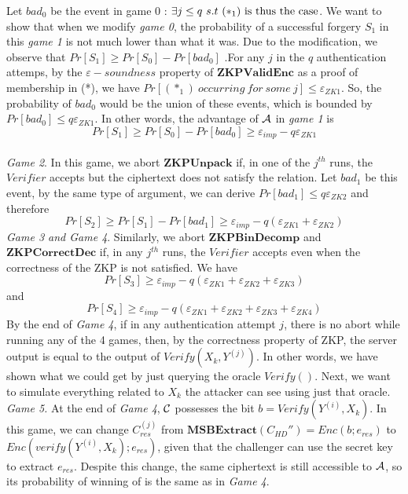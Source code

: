 Let $bad_0$ be the event in game 0 : $\exists j \leq q\  s.t\  (*_1)\
\textnormal{is thus the case}$. We want to show that when we modify \textit{game 0}, the
probability of a successful forgery $S_1$ in this \textit{game 1} is not much
lower than what it was. Due to the modification, we observe that
$
Pr[S_1] \geq Pr[S_0] - Pr[bad_0]
$
.For any $j$ in the $q$ authentication attemps, by the $\varepsilon-soundness$ property of
$\mathbf{ZKPValidEnc}$ as a proof of membership in (*), we have $Pr[(*_1)\
occurring\ for\ some \ j] \leq \varepsilon_{ZK1}$. So, the probability of $bad_0$
would be the union of these events, which is bounded by $Pr[bad_0] \leq
q\varepsilon_{ZK1}$. In other words, the advantage of $\mathcal{A}$ in \textit{game
	1} is
\[
Pr[S_1] \geq Pr[S_0] - Pr[bad_0] \geq \varepsilon_{imp} - q\varepsilon_{ZK1}
\]
\\
\textit{Game 2}. In this game, we abort $\mathbf{ZKPUnpack}$ if, in one of the
$j^{th}$ runs, the $Verifier$ accepts but the ciphertext does not satisfy the
relation. Let $bad_1$ be this event, by the same type of argument, we can
derive $Pr[bad_1] \leq q\varepsilon_{ZK2}$ and therefore
$$Pr[S_2] \geq Pr[S_1]
- Pr[bad_1] \geq \varepsilon_{imp} - q(\varepsilon_{ZK1}+\varepsilon_{ZK2})
$$
\textit{Game 3 and Game 4}. Similarly, we abort $\mathbf{ZKPBinDecomp}$ and
$\mathbf{ZKPCorrectDec}$ if, in any $j^{th}$ runs, the $Verifier$ accepts even
when the correctness of the ZKP is not satisfied. We have
$$Pr[S_3] \geq  \varepsilon_{imp} - q(\varepsilon_{ZK1}+\varepsilon_{ZK2}
+\varepsilon_{ZK3})
$$ and
$$Pr[S_4] \geq  \varepsilon_{imp} - q(\varepsilon_{ZK1}+\varepsilon_{ZK2} +
\varepsilon_{ZK3} + \varepsilon_{ZK4})
$$
By the end of \textit{Game 4}, if in any authentication attempt $j$, there is
no abort while running any of the 4 games, then, by the correctness property of ZKP, the
server output is equal to the output of $Verify(X_k, Y^{(j)})$. In other words,
we have shown what we could get by just querying the oracle $Verify()$. Next,
we want to simulate everything related to $X_k$ the attacker can see using
just that oracle.\\
\textit{Game 5.} At the end of \textit{Game 4}, $\mathcal{C}$ possesses the bit
$b = Verify(Y^{(i)},X_k)$. In this game, we can change $C_{res}^{(j)}$ from
$\mathbf{MSBExtract}(C_{HD}'') = Enc(b;e_{res})$ to
$Enc(verify(Y^{(i)},X_k);e_{res})$, given that the challenger can use the
secret key to extract $e_{res}$. Despite this change,  
the same ciphertext is still accessible to $\mathcal{A}$, so its probability of winning of 
is the same as in \textit{Game 4}.\\
